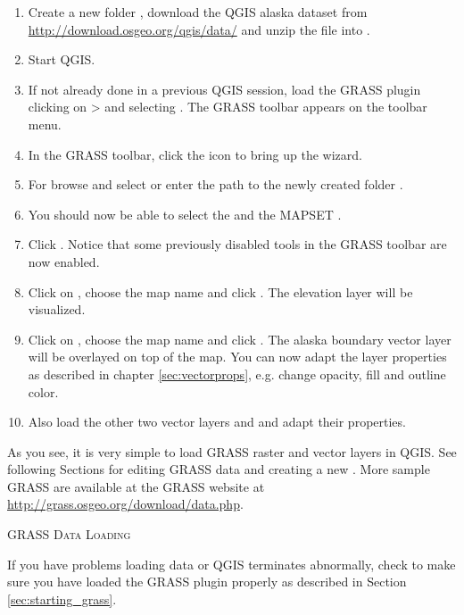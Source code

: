 \begin{enumerate}
  \item Create a new folder , download the QGIS alaska
  dataset  from
  \url{http://download.osgeo.org/qgis/data/} and unzip the file into
  . 
  \item Start QGIS.
  \item If not already done in a previous QGIS session, load the GRASS plugin
  clicking on  >  and
  selecting . The GRASS toolbar appears on the toolbar menu.
  \item In the GRASS toolbar, click the  icon to bring up the  wizard.
  \item For  browse and select or enter the path to the
  newly created folder .
  \item You should now be able to select the 
  and the MAPSET . 
  \item Click . Notice that some previously disabled tools in the 
  GRASS toolbar are now enabled.
  \item Click on ,
  choose the map name  and click . The elevation
  layer will be visualized.
  \item Click on ,
  choose the map name  and click . The alaska
  boundary vector layer will be overlayed on top of the  map. You can
  now adapt the layer properties as described in chapter \ref{sec:vectorprops},
  e.g. change opacity, fill and outline color.
  \item Also load the other two vector layers  and
   and adapt their properties.
\end{enumerate}

As you see, it is very simple to load GRASS raster and vector layers in QGIS. 
See following Sections for editing GRASS data and creating a new 
. More sample GRASS  are available at 
the GRASS website at \url{http://grass.osgeo.org/download/data.php}.

\begin{Tip}\caption{\textsc{GRASS Data Loading}}
If you have problems loading data or QGIS terminates abnormally,
check to make sure you have loaded the GRASS plugin properly as described in
Section \ref{sec:starting_grass}.
\end{Tip} 

